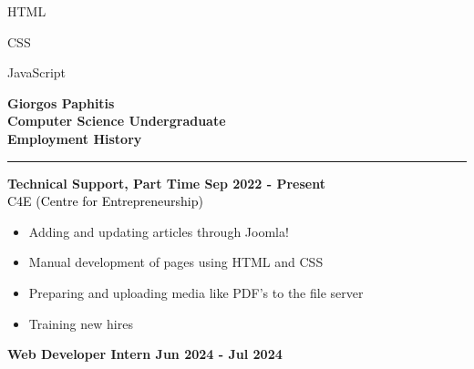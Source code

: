 \documentclass[12pt]{article}
\begin{document}
\begin{paracol}{2}
\begin{tcolorbox}[colback=bgcolor, colframe=bgcolor, boxrule=0cm, arc=0cm, outer arc=0cm, left=0.35cm, right=0.10cm, top=1cm, bottom=1.5cm,height=\textheight]
{\begin{itemize}[leftmargin=15pt, itemsep=0pt, topsep=0pt]
\begin{multicols}{2}
            \item HTML\\
            \item CSS\\
            \item JavaScript\\
         \end{multicols}
      \end{itemize}
      }
   \end{tcolorbox}
   \switchcolumn
      \vspace*{1.7cm}
      \textbf{\Huge \textcolor{bgcolor}{Giorgos Paphitis}}\\[0.5em]
      \textbf{Computer Science Undergraduate}\\
      \vspace{1.5cm}
      {\fontsize{14pt}{13pt}\selectfont
      \textbf{\textcolor{bgcolor}{Employment History}}\\[0.3em]
      }
      \hrule
      \vspace{0.5cm}
      \textbf{\textcolor{bgcolor}{Technical Support, Part Time \hfill Sep 2022 - Present}}\\[0.5em]
      \textcolor{black}{C4E (Centre for Entrepreneurship)}\\[0.5em]
      {\renewcommand{\labelitemi}{\textcolor{bgcolor}{\normalsize$\bullet$}}%
      \begin{itemize}[leftmargin=33pt, itemsep=0pt, topsep=0pt]
            \item Adding and updating articles through Joomla!\\
            \item Manual development of pages using HTML and CSS\\
            \item Preparing and uploading media like PDF's to the file server\\
            \item Training new hires\\
         \end{itemize}
      }
      \vspace{0.5cm}
      \textbf{\textcolor{bgcolor}{Web Developer Intern \hfill Jun 2024 - Jul 2024}}\\[0.5em]

\end{paracol}
\end{document}
